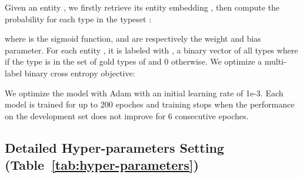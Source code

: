\documentclass[letterpaper]{article} \usepackage{aaai20}  \usepackage{times}  \usepackage{helvet} \usepackage{courier}  \usepackage[hyphens]{url}  \usepackage{graphicx} \urlstyle{rm} \def\UrlFont{\rm}  \usepackage{graphicx}  \frenchspacing  \setlength{\pdfpagewidth}{8.5in}  \setlength{\pdfpageheight}{11in}  \usepackage{multirow}
\begin{document}
Given an entity , we firstly retrieve its entity embedding , then compute the probability for each type in the typeset : 

where  is the sigmoid function,  and  are respectively the weight and bias parameter. For each entity , it is labeled with , a binary vector of all types where  if the  type is in the set of gold types of  and 0 otherwise. We optimize a multi-label binary cross entropy objective:

We optimize the model with Adam with an initial learning rate of 1e-3. Each model is trained for up to 200 epoches and training stops when the performance on the development set does not improve for 6 consecutive epoches. 

\subsection{Detailed Hyper-parameters Setting (Table~\ref{tab:hyper-parameters})}
\label{app:hp}

    \begin{table}[!ht]
        \small
        \centering
        \caption{Values of hyper-parameters.}
        \label{tab:hyper-parameters}
    \end{table}



\end{document}
